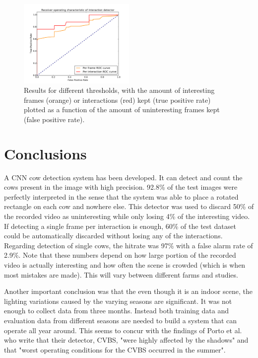 \documentclass{cta-author}
\begin{document}
\begin{figure}[tb]
\begin{center}
  \includegraphics[width=0.5\textwidth]{roc.pdf}
\end{center}
  \caption{Results for different thresholds, with the amount of interesting frames (orange) or interactions
(red) kept (true positive rate) plotted as a function of the amount of uninteresting frames kept (false
positive rate).}
  \label{fig:roc}
\end{figure}


\section{Conclusions}
A CNN cow detection system has been developed. It can detect and count the cows present in the image with
high precision. 92.8\% of the test images were perfectly interpreted in the sense that the system was able
to place a rotated rectangle on each cow and nowhere else. This detector was used to discard 50\% of the
recorded video as uninteresting while only losing 4\% of the interesting video. If detecting a single frame
per interaction is enough, 60\% of the test dataset could be automatically discarded without losing any of the
interactions. Regarding detection of single cows, the hitrate was 97\% with a false alarm rate of 2.9\%.
Note that these numbers depend on how large portion of the recorded video is actually interesting and how
often the scene is crowded (which is when most mistakes are made). This will vary between different farms and
studies.

Another important conclusion was that the even though it is an indoor scene, the lighting variations caused
by the varying seasons are significant. It was not enough to collect data from three months. Instead both
training data and evaluation data from different seasons are needed to build a system that can operate all
year around. This seems to concur with the findings of Porto et al. \cite{porto2015automatic} who write that
their detector, CVBS,
"were highly affected by the shadows" and that "worst operating
conditions for the CVBS occurred in the summer".
\end{document}
